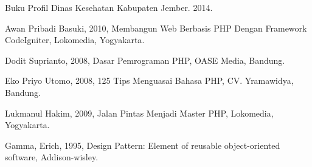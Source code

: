 \documentclass{jtetiproposalskripsi}
\begin{document}

\begin{thebibliography}{9}

Buku Profil Dinas Kesehatan Kabupaten Jember. 2014.

Awan Pribadi Basuki, 2010,  Membangun Web Berbasis PHP Dengan Framework CodeIgniter, Lokomedia, Yogyakarta.

Dodit Suprianto,  2008, Dasar Pemrograman PHP, OASE Media, Bandung.

Eko Priyo Utomo, 2008, 125 Tips Menguasai Bahasa PHP, CV. Yramawidya, Bandung.

Lukmanul Hakim, 2009,  Jalan Pintas Menjadi Master PHP, Lokomedia, Yogyakarta.

Gamma,  Erich, 1995, Design Pattern: Element  of reusable object-oriented software, Addison-wisley.

\end{thebibliography}
\end{document}
